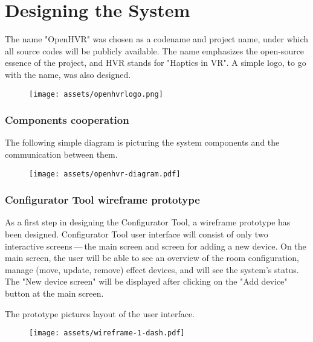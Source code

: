 \chapter{Designing the System}

The name "OpenHVR" was chosen as a codename and project name, under which
all source codes will be publicly available. The name emphasizes the open-source
essence of the project, and HVR stands for "Haptics in VR". A simple logo, to
go with the name, was also designed.


\begin{figure}[h]{}
\centering\texttt{[image: assets/openhvrlogo.png]}
\caption{}

\end{figure}

\hypertarget{x-components-cooperation}{\subsection*{Components cooperation}}
The following simple diagram is picturing the system components and the
communication between them.


\begin{figure}[h]{}
\centering\texttt{[image: assets/openhvr-diagram.pdf]}
\caption{}

\end{figure}


\hypertarget{x-configurator-tool-wireframe-prototype}{\subsection*{Configurator Tool wireframe prototype}}
As a first step in designing the Configurator Tool, a wireframe prototype
has been designed. Configurator Tool user interface will consist of only
two interactive screens — the main screen and screen for adding a new device.
On the main screen, the user will be able to see an overview of the room configuration,
manage (move, update, remove) effect devices, and will see the system’s status.
The "New device screen" will be displayed after clicking on the "Add device"
button at the main screen.


The prototype pictures layout of the user interface.


\begin{figure}[h]{}
\centering\texttt{[image: assets/wireframe-1-dash.pdf]}
\caption{}

\end{figure}

